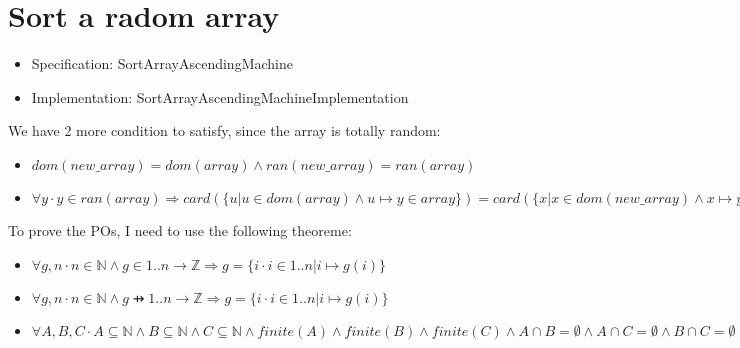 \section{Sort a radom array}

\begin{itemize}
\item Specification: SortArrayAscendingMachine
\item Implementation: SortArrayAscendingMachineImplementation
\end{itemize}

We have 2 more condition to satisfy, since the array is totally random: 
\begin{itemize}
\item $dom(new\_array) = dom(array) \land ran(new\_array) = ran(array)$
\item $\forall y \cdot y \in ran(array) \Rightarrow card(\{u | u \in dom(array) \land u \mapsto y \in array\}) = card(\{x | x \in dom(new\_array) \land x \mapsto y \in new_array\})$
\end{itemize}

To prove the POs, I need to use the following theoreme: 
\begin{itemize}
\item $\forall g,n \cdot n \in \mathbb{N} \land g \in 1..n \to \mathbb{Z} \Rightarrow g=\{i \cdot i \in 1..n | i \mapsto g(i)\}$
\item $\forall g,n \cdot n \in \mathbb{N} \land g \pfun 1..n \to \mathbb{Z} \Rightarrow g= \{i \cdot i \in 1..n | i \mapsto g(i)\}$
\item $\forall A,B,C \cdot A \subseteq \mathbb{N} \land B \subseteq \mathbb{N} \land C \subseteq \mathbb{N} \land finite(A) \land finite(B) \land finite(C) \land A \cap B = \emptyset \land A \cap C = \emptyset \land B \cap C = \emptyset \Rightarrow card(A \cup B \cup C) = card(A) + card(B) + card(C)$
\end{itemize}